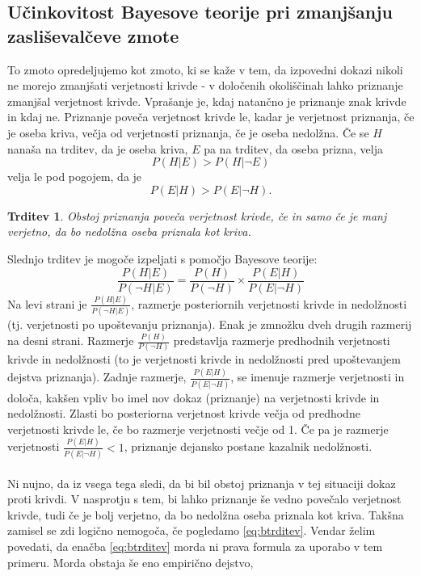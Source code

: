 \documentclass[12pt,a4paper]{amsart}
\theoremstyle{definition} %
\theoremstyle{plain} %
\newtheorem{trditev}[definicija]{Trditev}
\begin{document}
\subsection{Učinkovitost Bayesove teorije pri zmanjšanju zasliševalčeve zmote}
To zmoto opredeljujemo kot zmoto, ki se kaže v tem, da izpovedni dokazi nikoli ne morejo zmanjšati verjetnosti krivde - v določenih okoliščinah 
lahko priznanje zmanjšal verjetnost krivde. Vprašanje je, kdaj natančno je priznanje znak krivde in kdaj ne. Priznanje poveča verjetnost krivde 
le, kadar je verjetnost priznanja, če je oseba kriva, večja od verjetnosti priznanja, če je oseba nedolžna. Če se $H$ nanaša na trditev, da je 
oseba kriva, $E$ pa na trditev, da oseba prizna, velja
\[
    P(H \lvert E) > P(H \lvert \neg E)
\]  
velja le pod pogojem, da je 
\[
    P(E \lvert H) > P(E \lvert \neg H).
\] 
\begin{trditev}
    Obstoj priznanja poveča verjetnost krivde, če in samo če je manj verjetno, da bo nedolžna oseba priznala kot kriva.
\end{trditev}
Slednjo trditev je mogoče izpeljati s pomočjo Bayesove teorije:
\begin{equation}\label{eq:btrditev}
    \frac{P(H \lvert E)}{P(\neg H \lvert E)} = \frac{P(H)}{P(\neg H)}  \times \frac{P(E \lvert H)}{P(E \lvert \neg H)}
\end{equation}
Na levi strani je $\frac{P(H \lvert E)}{P(\neg H \lvert E)}$, razmerje posteriornih verjetnosti krivde in nedolžnosti (tj. verjetnosti po 
upoštevanju priznanja). Enak je zmnožku dveh drugih razmerij na desni strani. Razmerje $\frac{P(H)}{P(\neg H)}$ predstavlja razmerje predhodnih 
verjetnosti krivde in nedolžnosti (to je verjetnosti krivde in nedolžnosti pred upoštevanjem dejstva priznanja). Zadnje razmerje, 
$\frac{P(E \lvert H)}{P(E \lvert \neg H)}$, se imenuje razmerje verjetnosti in določa, kakšen vpliv bo imel nov dokaz (priznanje) na 
verjetnosti krivde in nedolžnosti. Zlasti bo posteriorna verjetnost krivde večja od predhodne verjetnosti krivde le, če bo razmerje verjetnosti 
večje od 1. Če pa je razmerje verjetnosti $\frac{P(E \lvert H)}{P(E \lvert \neg H)} < 1$, priznanje dejansko postane kazalnik nedolžnosti. \\\\
Ni nujno, da iz vsega tega sledi, da bi bil obstoj priznanja v tej situaciji dokaz proti krivdi. V nasprotju s tem, bi lahko priznanje še vedno 
povečalo verjetnost krivde, tudi če je bolj verjetno, da bo nedolžna oseba priznala kot kriva. Takšna zamisel se zdi logično nemogoča, če 
pogledamo \eqref{eq:btrditev}. Vendar želim povedati, da enačba \eqref{eq:btrditev} morda ni prava formula za uporabo v tem primeru. Morda obstaja še eno empirično dejstvo, 
\end{document}
